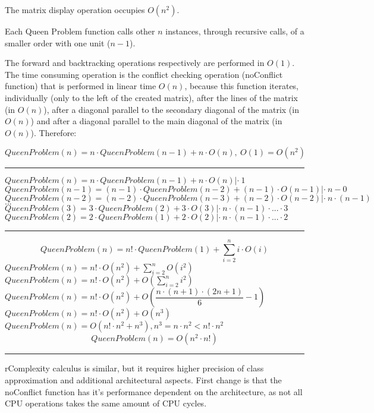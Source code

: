 The matrix display operation occupies $ O (n ^ 2) $.

Each Queen Problem function calls other $ n $ instances, through recursive calls, of a smaller order with one unit ($ n-1 $).

The forward and backtracking operations respectively are performed in $ O (1) $. The time consuming operation is the conflict checking operation (noConflict function) that is performed in linear time $ O (n) $, because this function iterates, individually (only to the left of the created matrix), after the lines of the matrix (in $ O (n) $), after a diagonal parallel to the secondary diagonal of the matrix (in $ O (n) $) and after a diagonal parallel to the main diagonal of the matrix (in $ O (n) $).
Therefore:

$QueenProblem(n) = n \cdot QueenProblem(n-1) + n \cdot O(n),\ O(1)=O(n^2)$ \\ 
\noindent\rule{16cm}{0.4pt}
$QueenProblem(n) = n \cdot QueenProblem(n-1) + n \cdot O(n) |\cdot\ 1$ \\
$QueenProblem(n-1) = (n-1) \cdot QueenProblem(n-2) + (n-1) \cdot O(n-1) |\cdot\ n-0$ \\
$QueenProblem(n-2) = (n-2) \cdot QueenProblem(n-3) + (n-2) \cdot O(n-2) |\cdot\ n\cdot (n-1)$ \\
$...$ \\
$QueenProblem(3) = 3 \cdot QueenProblem(2) + 3 \cdot O(3) |\cdot\ n\cdot (n-1) \cdot ... \cdot 3$ \\
$QueenProblem(2) = 2 \cdot QueenProblem(1) + 2 \cdot O(2) |\cdot\ n\cdot (n-1) \cdot ... \cdot 2$ \\
\noindent\rule{16cm}{0.4pt}
\[QueenProblem(n) = n! \cdot QueenProblem(1) + \sum_{i=2}^{n} i\cdot O(i) \] 
$QueenProblem(n) = n! \cdot O(n^2) + \sum_{i=2}^{n} O(i^2)$ \\
$QueenProblem(n) = n! \cdot O(n^2) +  O(\sum_{i=2}^{n} i^2)$ \\
$QueenProblem(n) = n! \cdot O(n^2) +  O(\dfrac{n\cdot(n+1)\cdot(2n+1)}{6} - 1)$ \\
$QueenProblem(n) = n! \cdot O(n^2) +  O(n^3)$ \\
$QueenProblem(n) = O(n! \cdot n^2 + n^3) , n^3 = n \cdot n^2 < n! \cdot n^2$ \\
\[QueenProblem(n) = O(n^2\cdot n!) \]
\noindent\rule{16cm}{0.4pt}

rComplexity calculus is similar, but it requires higher precision of class approximation and additional architectural aspects. 
First change is that the noConflict function has it's performance dependent on the architecture, as not all CPU operations takes the same amount of CPU cycles. 

